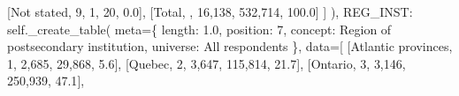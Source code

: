 \documentclass[
  11pt,
  a4paper,
]{article}
\newenvironment{Shaded}{\begin{snugshade}}{\end{snugshade}}
\newcommand{\NormalTok}[1]{\textcolor[rgb]{0.00,0.23,0.31}{#1}}
\newcommand{\OperatorTok}[1]{\textcolor[rgb]{0.37,0.37,0.37}{#1}}
\newcommand{\StringTok}[1]{\textcolor[rgb]{0.13,0.47,0.30}{#1}}
\newcommand{\VariableTok}[1]{\textcolor[rgb]{0.07,0.07,0.07}{#1}}
\begin{document}
\begin{Shaded}
\begin{Highlighting}[]
\NormalTok{                    [}\StringTok{\textquotesingle{}Not stated\textquotesingle{}}\NormalTok{, }\StringTok{\textquotesingle{}9\textquotesingle{}}\NormalTok{, }\StringTok{\textquotesingle{}1\textquotesingle{}}\NormalTok{, }\StringTok{\textquotesingle{}20\textquotesingle{}}\NormalTok{, }\StringTok{\textquotesingle{}0.0\textquotesingle{}}\NormalTok{],}
\NormalTok{                    [}\StringTok{\textquotesingle{}Total\textquotesingle{}}\NormalTok{, }\StringTok{\textquotesingle{}\textquotesingle{}}\NormalTok{, }\StringTok{\textquotesingle{}16,138\textquotesingle{}}\NormalTok{, }\StringTok{\textquotesingle{}532,714\textquotesingle{}}\NormalTok{, }\StringTok{\textquotesingle{}100.0\textquotesingle{}}\NormalTok{]}
\NormalTok{                ]}
\NormalTok{            ),}
            \StringTok{\textquotesingle{}REG\_INST\textquotesingle{}}\NormalTok{: }\VariableTok{self}\NormalTok{.\_create\_table(}
\NormalTok{                meta}\OperatorTok{=}\NormalTok{\{}
                    \StringTok{\textquotesingle{}length\textquotesingle{}}\NormalTok{: }\StringTok{\textquotesingle{}1.0\textquotesingle{}}\NormalTok{, }\StringTok{\textquotesingle{}position\textquotesingle{}}\NormalTok{: }\StringTok{\textquotesingle{}7\textquotesingle{}}\NormalTok{,}
                    \StringTok{\textquotesingle{}concept\textquotesingle{}}\NormalTok{: }\StringTok{\textquotesingle{}Region of postsecondary institution\textquotesingle{}}\NormalTok{,}
                    \StringTok{\textquotesingle{}universe\textquotesingle{}}\NormalTok{: }\StringTok{\textquotesingle{}All respondents\textquotesingle{}}
\NormalTok{                \},}
\NormalTok{                data}\OperatorTok{=}\NormalTok{[}
\NormalTok{                    [}\StringTok{\textquotesingle{}Atlantic provinces\textquotesingle{}}\NormalTok{, }\StringTok{\textquotesingle{}1\textquotesingle{}}\NormalTok{, }\StringTok{\textquotesingle{}2,685\textquotesingle{}}\NormalTok{, }\StringTok{\textquotesingle{}29,868\textquotesingle{}}\NormalTok{, }\StringTok{\textquotesingle{}5.6\textquotesingle{}}\NormalTok{],}
\NormalTok{                    [}\StringTok{\textquotesingle{}Quebec\textquotesingle{}}\NormalTok{, }\StringTok{\textquotesingle{}2\textquotesingle{}}\NormalTok{, }\StringTok{\textquotesingle{}3,647\textquotesingle{}}\NormalTok{, }\StringTok{\textquotesingle{}115,814\textquotesingle{}}\NormalTok{, }\StringTok{\textquotesingle{}21.7\textquotesingle{}}\NormalTok{],}
\NormalTok{                    [}\StringTok{\textquotesingle{}Ontario\textquotesingle{}}\NormalTok{, }\StringTok{\textquotesingle{}3\textquotesingle{}}\NormalTok{, }\StringTok{\textquotesingle{}3,146\textquotesingle{}}\NormalTok{, }\StringTok{\textquotesingle{}250,939\textquotesingle{}}\NormalTok{, }\StringTok{\textquotesingle{}47.1\textquotesingle{}}\NormalTok{],}

\end{Highlighting}
\end{Shaded}
\end{document}
